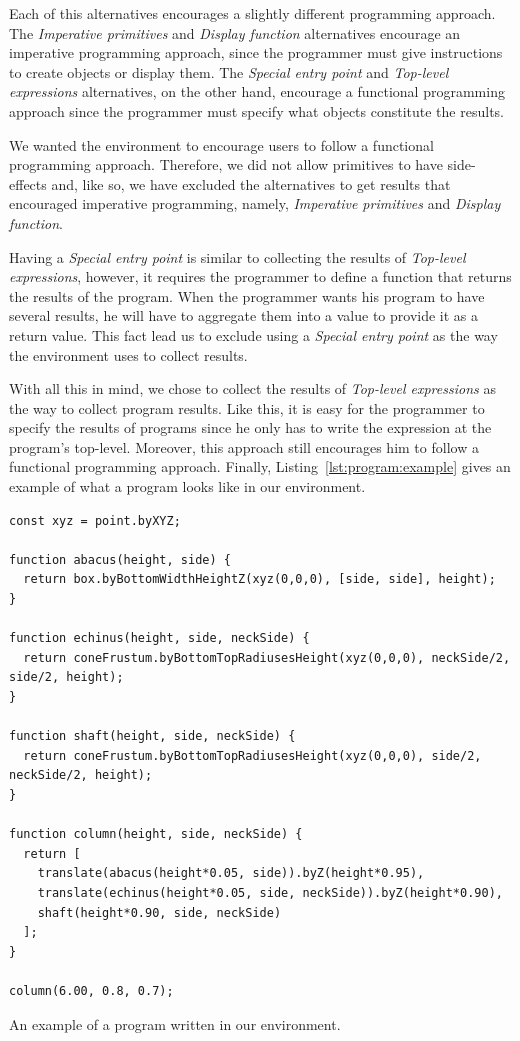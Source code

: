 Each of this alternatives encourages a slightly different programming approach.
The {\it Imperative primitives} and {\it Display function} alternatives encourage an imperative programming approach, since the programmer must give instructions to create objects or display them.
The {\it Special entry point} and {\it Top-level expressions} alternatives, on the other hand, encourage a functional programming approach since the programmer must specify what objects constitute the results.

We wanted the environment to encourage users to follow a functional programming approach.
Therefore, we did not allow primitives to have side-effects and, like so, we have excluded the alternatives to get results that encouraged imperative programming, namely, {\it Imperative primitives} and {\it Display function}.

Having a {\it Special entry point} is similar to collecting the results of {\it Top-level expressions}, however, it requires the programmer to define a function that returns the results of the program.
When the programmer wants his program to have several results, he will have to aggregate them into a value to provide it as a return value.
This fact lead us to exclude using a {\it Special entry point} as the way the environment uses to collect results.

With all this in mind, we chose to collect the results of {\it Top-level expressions} as the way to collect program results.
Like this, it is easy for the programmer to specify the results of programs since he only has to write the expression at the program's top-level.
Moreover, this approach still encourages him to follow a functional programming approach.
Finally, Listing~\ref{lst:program:example} gives an example of what a program looks like in our environment.

\begin{listing}
\begin{verbatim}
const xyz = point.byXYZ;

function abacus(height, side) {
  return box.byBottomWidthHeightZ(xyz(0,0,0), [side, side], height);
}

function echinus(height, side, neckSide) {
  return coneFrustum.byBottomTopRadiusesHeight(xyz(0,0,0), neckSide/2, side/2, height);
}

function shaft(height, side, neckSide) {
  return coneFrustum.byBottomTopRadiusesHeight(xyz(0,0,0), side/2, neckSide/2, height);
}

function column(height, side, neckSide) {
  return [
    translate(abacus(height*0.05, side)).byZ(height*0.95),
    translate(echinus(height*0.05, side, neckSide)).byZ(height*0.90),
    shaft(height*0.90, side, neckSide)
  ];
}

column(6.00, 0.8, 0.7);
\end{verbatim}
\caption{An example of a program written in our environment.}
\label{lst:program:example}
\end{listing}



